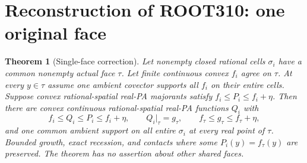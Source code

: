 \documentclass[11pt]{article}
\newtheorem{theorem}{Theorem}[section]
\begin{document}
\section{Reconstruction of ROOT310: one original face}
\begin{theorem}[Single-face correction]\label{thm:single}
Let nonempty closed rational cells $\sigma_i$ have a common nonempty actual face $\tau$. Let finite continuous convex $f_i$ agree on $\tau$. At every $y\in\tau$ assume one ambient covector supports all $f_i$ on their entire cells. Suppose convex rational-spatial real-PA majorants satisfy $f_i\leq P_i\leq f_i+\eta$. Then there are convex continuous rational-spatial real-PA functions $Q_i$ with
\[
 f_i\leq Q_i\leq P_i\leq f_i+\eta,
 \qquad Q_i|_\tau=g_\tau,
 \qquad f_\tau\leq g_\tau\leq f_\tau+\eta,
\]
and one common ambient support on all entire $\sigma_i$ at every real point of $\tau$. Bounded growth, exact recession, and contacts where some $P_i(y)=f_\tau(y)$ are preserved. The theorem has no assertion about other shared faces.
\end{theorem}
\end{document}
